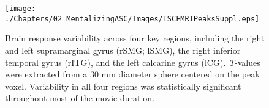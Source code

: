 \begin{figure}[!ht]
	\centering
    \texttt{[image: ./Chapters/02\_MentalizingASC/Images/ISCFMRIPeaksSuppl.eps]}
	\caption{Brain response variability across four key regions, including the right and left supramarginal gyrus (rSMG; lSMG), the right inferior temporal gyrus (rITG), and the left calcarine gyrus (lCG). \textit{T}-values were extracted from a 30 mm diameter sphere centered on the peak voxel. Variability in all four regions was statistically significant throughout most of the movie duration.}
    \vspace*{-10pt}
	\label{fig:isc-fmri-peak-suppl}
\end{figure}



